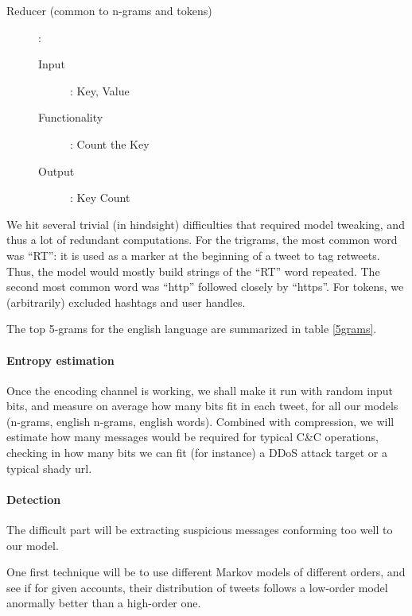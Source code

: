 \documentclass[a4paper,11pt]{article}
\begin{document}
\begin{flushleft}
\begin{description}
\begin{description}
\end{description}
	
\item[Reducer (common to n-grams and tokens)]:

\begin{description}
\item[Input]: {Key, Value}

\item[Functionality]: Count the Key

\item[Output]: Key Count
\end{description}

\end{description}
 
\end{flushleft}

We hit several trivial (in hindsight) difficulties that required model tweaking, and thus a lot of redundant computations. For the trigrams, the most common word was ``RT'': it is used as a marker at the beginning of a tweet to tag retweets. Thus, the model would mostly build strings of the ``RT'' word repeated. The second most common word was ``http'' followed closely by ``https''. For tokens, we (arbitrarily) excluded hashtags and user handles.

The top 5-grams for the english language are summarized in table \ref{5grams}.

\paragraph{Entropy estimation}

Once the encoding channel is working, we shall make it run with random input bits, and measure on average how many bits fit in each tweet, for all our models (n-grams, english n-grams, english words). Combined with compression, we will estimate how many messages would be required for typical C\&C operations, checking in how many bits we can fit (for instance) a DDoS attack target or a typical shady url.

\paragraph{Detection}

The difficult part will be extracting suspicious messages conforming too well to our model. 

One first technique will be to use different Markov models of different orders, and see if for given accounts, their distribution of tweets follows a low-order model anormally better than a high-order one.
\end{document}
